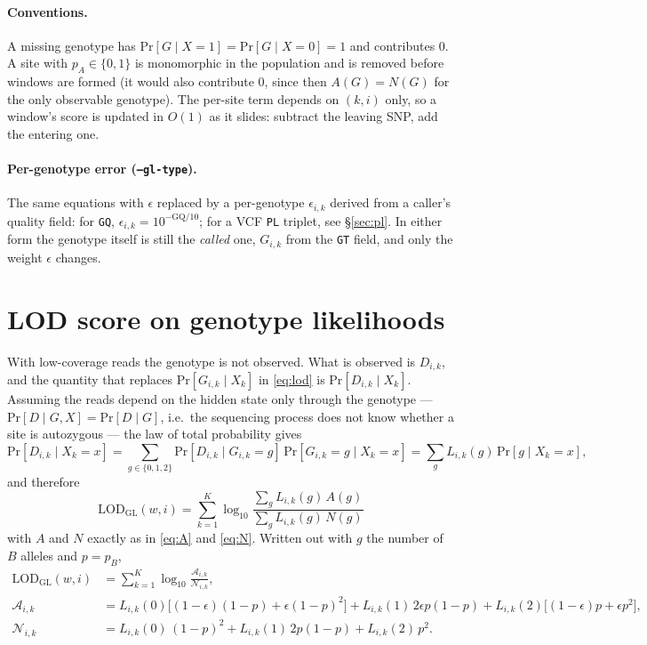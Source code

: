 \documentclass[11pt]{article}
\renewcommand{\Pr}[1]{\mathrm{Pr}\!\left[#1\right]}
\newcommand{\LOD}{\mathrm{LOD}}
\newcommand{\code}[1]{\texttt{#1}}
\begin{document}
\paragraph{Conventions.} A missing genotype has $\Pr{G \mid X=1} = \Pr{G \mid X=0} = 1$ and contributes $0$. A site with $p_A \in \{0, 1\}$ is monomorphic in the population and is removed before windows are formed (it would also contribute $0$, since then $A(G) = N(G)$ for the only observable genotype). The per-site term depends on $(k, i)$ only, so a window's score is updated in $O(1)$ as it slides: subtract the leaving SNP, add the entering one.

\paragraph{Per-genotype error (\code{--gl-type}).} The same equations with $\epsilon$ replaced by a per-genotype $\epsilon_{i,k}$ derived from a caller's quality field: for \code{GQ}, $\epsilon_{i,k} = 10^{-\mathrm{GQ}/10}$; for a VCF \code{PL} triplet, see \S\ref{sec:pl}. In either form the genotype itself is still the \emph{called} one, $G_{i,k}$ from the \code{GT} field, and only the weight $\epsilon$ changes.

\section{LOD score on genotype likelihoods}
\label{sec:gl}

With low-coverage reads the genotype is not observed. What is observed is $D_{i,k}$, and the quantity that replaces $\Pr{G_{i,k} \mid X_k}$ in \eqref{eq:lod} is $\Pr{D_{i,k} \mid X_k}$. Assuming the reads depend on the hidden state only through the genotype --- $\Pr{D \mid G, X} = \Pr{D \mid G}$, i.e.\ the sequencing process does not know whether a site is autozygous --- the law of total probability gives
\begin{equation}
\Pr{D_{i,k} \mid X_k = x} = \sum_{g \in \{0,1,2\}} \Pr{D_{i,k} \mid G_{i,k} = g}\, \Pr{G_{i,k} = g \mid X_k = x} = \sum_{g} L_{i,k}(g)\, \Pr{g \mid X_k = x},
\end{equation}
and therefore
\begin{equation}
\boxed{\;
\LOD_{\mathrm{GL}}(w,i) = \sum_{k=1}^{K} \log_{10}
\frac{\sum_{g} L_{i,k}(g)\, A(g)}{\sum_{g} L_{i,k}(g)\, N(g)}
\;}
\label{eq:lodgl}
\end{equation}
with $A$ and $N$ exactly as in \eqref{eq:A} and \eqref{eq:N}. Written out with $g$ the number of $B$ alleles and $p = p_B$,
\begin{equation}
\begin{aligned}
\LOD_{\mathrm{GL}}(w,i) &= \sum_{k=1}^{K} \log_{10} \frac{\mathcal{A}_{i,k}}{\mathcal{N}_{i,k}}, \\
\mathcal{A}_{i,k} &= L_{i,k}(0)\big[(1-\epsilon)(1-p) + \epsilon(1-p)^2\big] + L_{i,k}(1)\,2\epsilon p(1-p) + L_{i,k}(2)\big[(1-\epsilon)p + \epsilon p^2\big], \\
\mathcal{N}_{i,k} &= L_{i,k}(0)\,(1-p)^2 + L_{i,k}(1)\,2p(1-p) + L_{i,k}(2)\,p^2 .
\end{aligned}
\end{equation}
\end{document}
